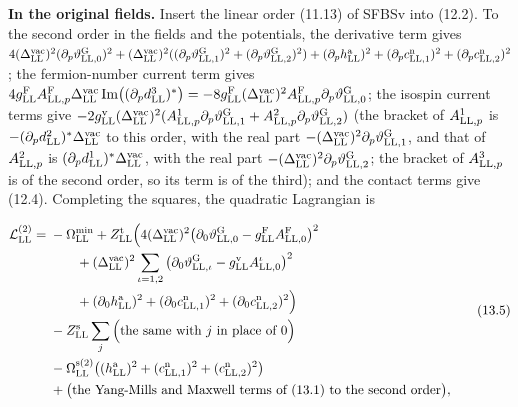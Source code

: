 \documentclass[
  10pt,
]{article}
\begin{document}
\textbf{In the original fields.} Insert the linear order (11.13) of
SFBSv into (12.2). To the second order in the fields and the potentials,
the derivative term gives
\(4(\Delta^{\rm vac}_{\rm LL})^2(\partial_p\vartheta^{\rm G}_{{\rm LL},0})^2+(\Delta^{\rm vac}_{\rm LL})^2((\partial_p\vartheta^{\rm G}_{{\rm LL},1})^2+(\partial_p\vartheta^{\rm G}_{{\rm LL},2})^2)+(\partial_ph^{\rm a}_{\rm LL})^2+(\partial_pc^{\rm n}_{{\rm LL},1})^2+(\partial_pc^{\rm n}_{{\rm LL},2})^2\);
the fermion-number current term gives
\(4g^{\rm F}_{\rm LL}A^{\rm F}_{{\rm LL},p}\Delta^{\rm vac}_{\rm LL}\,{\rm Im}\big((\partial_pd^3_{\rm LL})^*\big)=-8g^{\rm F}_{\rm LL}(\Delta^{\rm vac}_{\rm LL})^2A^{\rm F}_{{\rm LL},p}\partial_p\vartheta^{\rm G}_{{\rm LL},0}\);
the isospin current terms give
\(-2g^{\rm v}_{\rm LL}(\Delta^{\rm vac}_{\rm LL})^2(A^1_{{\rm LL},p}\partial_p\vartheta^{\rm G}_{{\rm LL},1}+A^2_{{\rm LL},p}\partial_p\vartheta^{\rm G}_{{\rm LL},2})\)
(the bracket of \(A^1_{{\rm LL},p}\) is
\(-(\partial_pd^2_{\rm LL})^*\Delta^{\rm vac}_{\rm LL}\) to this order,
with the real part
\(-(\Delta^{\rm vac}_{\rm LL})^2\partial_p\vartheta^{\rm G}_{{\rm LL},1}\),
and that of \(A^2_{{\rm LL},p}\) is
\((\partial_pd^1_{\rm LL})^*\Delta^{\rm vac}_{\rm LL}\), with the real
part
\(-(\Delta^{\rm vac}_{\rm LL})^2\partial_p\vartheta^{\rm G}_{{\rm LL},2}\);
the bracket of \(A^3_{{\rm LL},p}\) is of the second order, so its term
is of the third); and the contact terms give (12.4). Completing the
squares, the quadratic Lagrangian is

\[\begin{aligned}\mathcal L^{(2)}_{\rm LL}={}&-\Omega^{\rm min}_{\rm LL}+Z^{\rm t}_{\rm LL}\Big(4(\Delta^{\rm vac}_{\rm LL})^2\big(\partial_0\vartheta^{\rm G}_{{\rm LL},0}-g^{\rm F}_{\rm LL}A^{\rm F}_{{\rm LL},0}\big)^2\\&\qquad+(\Delta^{\rm vac}_{\rm LL})^2\sum_{\iota=1,2}\big(\partial_0\vartheta^{\rm G}_{{\rm LL},\iota}-g^{\rm v}_{\rm LL}A^\iota_{{\rm LL},0}\big)^2\\&\qquad+(\partial_0h^{\rm a}_{\rm LL})^2+(\partial_0c^{\rm n}_{{\rm LL},1})^2+(\partial_0c^{\rm n}_{{\rm LL},2})^2\Big)\\&-Z^{\rm s}_{\rm LL}\sum_j\Big(\text{the same with }j\text{ in place of }0\Big)\\&-\Omega^{\rm s(2)}_{\rm LL}\big((h^{\rm a}_{\rm LL})^2+(c^{\rm n}_{{\rm LL},1})^2+(c^{\rm n}_{{\rm LL},2})^2\big)\\&+\big(\text{the Yang-Mills and Maxwell terms of (13.1) to the second order}\big),\end{aligned}\tag{13.5}\]
\end{document}
